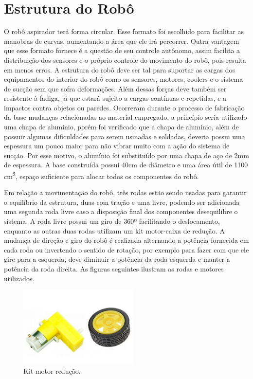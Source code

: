 
\section{Estrutura do Robô} %
\label{sec:estrutura_do_robô}

O robô aspirador terá forma circular. Esse formato foi escolhido para facilitar as manobras de curvas, aumentando a área que ele irá percorrer. Outra vantagem que esse formato fornece é a questão de seu controle autônomo, assim facilita a distribuição dos sensores e o próprio controle do movimento do robô, pois resulta em menos erros. A estrutura do robô deve ser tal para suportar as cargas dos equipamentos do interior do robô como os sensores, motores, coolers e o sistema de sucção sem que sofra deformações. Além dessas forças deve também ser resistente à fadiga, já que estará sujeito a cargas contínuas e repetidas, e a impactos contra objetos ou paredes. Ocorreram durante o processo de fabricação da base mudanças relacionadas ao material empregado, a princípio seria utilizado uma chapa de alumínio, porém foi verificado que a chapa de alumínio, além de possuir algumas dificuldades para serem usinadas e soldadas, deveria possui uma espessura um pouco maior para não vibrar muito com a ação do sistema de sucção. Por esse motivo, o alumínio foi substituído por uma chapa de aço de 2mm de espessura. A base construída possui 40cm de diâmetro e uma área útil de 1100 cm\textsuperscript{2}, espaço suficiente para alocar todos os componentes do robô.

Em relação a movimentação do robô, três rodas estão sendo usadas para garantir o equilíbrio da estrutura, duas com tração e uma livre, podendo ser adicionada uma segunda roda livre caso a disposição final dos componentes desequilibre o sistema.  A roda livre possui um giro de 360º facilitando o deslocamento, enquanto as outras duas rodas utilizam um kit motor-caixa de redução. A mudança de direção e giro do robô é realizada alternando a potência fornecida em cada roda ou invertendo o sentido de rotação, por exemplo para fazer com que ele gire para a esquerda, deve diminuir a potência da roda esquerda e manter a potência da roda direita. As figuras seguintes ilustram as rodas e motores utilizados.

\begin{figure}[H]
		\centering
		\includegraphics[scale=0.7]{figuras/kit_motor_reducao.png}
		\caption{Kit motor redução.}
		\label{img:kit_motor_reducao}
	\end{figure}


